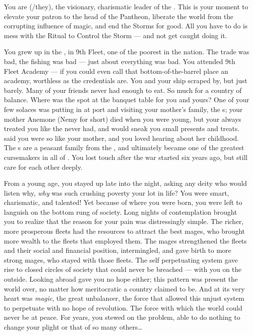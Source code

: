 \documentclass[char]{GL2020}
\begin{document}
\name{\cChupLeader{}}

You are \cChupLeader{\intro} (\cChupLeader{\they}/they), the visionary, charismatic leader of the \pGoaties{}. This is your moment to elevate your patron \cGenesis{\Deity} \cGenesis{\intro} to the head of the Pantheon, liberate the world from the corrupting influence of magic, and end the Storms for good. All you have to do is mess with the Ritual to Control the Storm — and not get caught doing it.

You grew up in the \pShip{}, in 9th Fleet, one of the poorest in the nation. The trade was bad, the fishing was bad — just about everything was bad. You attended 9th Fleet Academy — if you could even call that bottom-of-the-barrel place an academy, worthless as the credentials are. You and your ship scraped by, but just barely. Many of your friends never had enough to eat. So much for a country of balance. Where was the spot at the banquet table for you and yours? One of your few solaces was putting in at port and visiting your mother’s family, the \cCurse{\formal}s; your mother Anemone (Nemy for short) died when you were young, but your \cCurse{\auncle} \cCurse{\intro} always treated you like the \cChupLeader{\offspring} \cCurse{\they} never had, and would sneak you small presents and treats. \cCurse{\They} said you were so like your mother, and you loved hearing about her childhood. The \cCurse{\formal}s are a peasant family from the \pFarm{}, and \cCurse{} ultimately became one of the greatest cursemakers in all of \pEarth{}. You lost touch after the war started six years ago, but still care for each other deeply.

From a young age, you stayed up late into the night, asking any deity who would listen why, \emph{why} was such crushing poverty your lot in life? You were smart, charismatic, and talented! Yet because of where you were born, you were left to languish on the bottom rung of society. Long nights of contemplation brought you to realize that the reason for your pain was distressingly simple. The richer, more prosperous fleets had the resources to attract the best mages, who brought more wealth to the fleets that employed them. The mages strengthened the fleets and their social and financial position, intermingled, and gave birth to more strong mages, who stayed with those fleets. The self perpetuating system gave rise to closed circles of society that could never be breached — with you on the outside. Looking abroad gave you no hope either; this pattern was present the world over, no matter how meritocratic a country claimed to be. And at its very heart was \emph{magic}, the great unbalancer, the force that allowed this unjust system to perpetuate with no hope of revolution. The force with which the world could never be at peace. For years, you stewed on the problem, able to do nothing to change your plight or that of so many others\ldots{}
\end{document}
